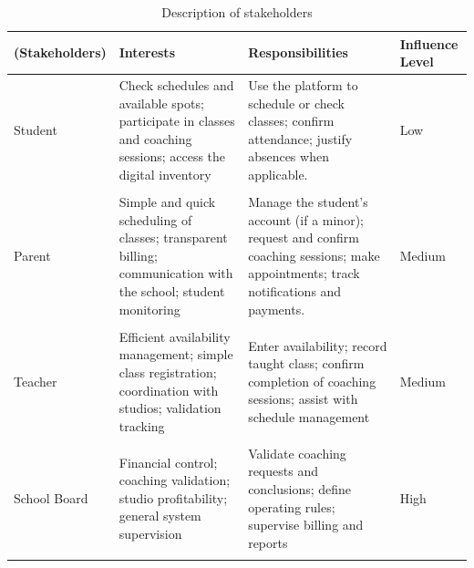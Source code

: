 \documentclass[12pt,a4paper]{report}
\begin{document}
\begin{table}[H]
\centering
\caption{Description of stakeholders}
\renewcommand{\arraystretch}{1}
\begin{tabularx}{\textwidth}{@{}>{\raggedright\arraybackslash}p{3cm} X X >{\raggedright\arraybackslash}p{3cm}@{}}
\toprule
\textbf{(Stakeholders)} & \textbf{Interests} & \textbf{Responsibilities} & \textbf{Influence Level} \\
\midrule
Student &
Check schedules and available spots; participate in classes and coaching sessions; access the digital inventory &
Use the platform to schedule or check classes; confirm attendance; justify absences when applicable. &
Low \\
\\
Parent & 
Simple and quick scheduling of classes; transparent billing; communication with
the school; student monitoring &
Manage the student's account (if a minor); request and confirm coaching sessions; make appointments; track notifications and payments. &
Medium \\
\\
Teacher & 
Efficient availability management; simple class registration; coordination with studios; validation tracking &
Enter availability; record taught class; confirm completion of coaching sessions; assist with schedule management &
Medium \\
\\
School Board & 
Financial control; coaching validation; studio profitability; general system supervision &
Validate coaching requests and conclusions; define operating rules; supervise billing and reports &
High \\
 \\
\bottomrule
\end{tabularx}
\end{table}
\end{document}
